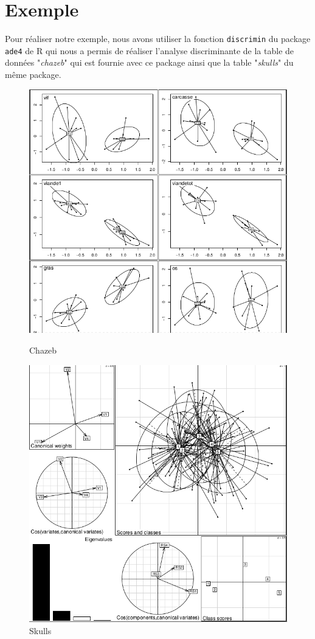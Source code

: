 \newpage
\section{Exemple}

Pour réaliser notre exemple, nous avons utiliser la fonction \texttt{discrimin} du package \texttt{ade4} de R qui nous a permis de réaliser l'analyse discriminante de la table de données "\emph{chazeb}" qui est fournie avec ce package ainsi que la table "\emph{skulls}" du même package.
\begin{figure}[h]
\centering
\includegraphics[scale=.33]{"LDA/Chazeb"}
\caption{Chazeb}

\includegraphics[scale=.33]{"LDA/Skulls"}
\caption{Skulls}
\end{figure}

